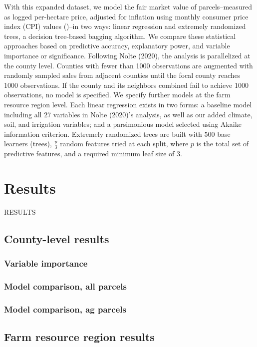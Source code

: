 \documentclass[12pt]{article}
\begin{document}
With this expanded dataset, we model the fair market value of parcels--measured as logged per-hectare price, adjusted for inflation using monthly consumer price index (CPI) values (\cite{blsConsumerPrice})--in two ways: linear regression and extremely randomized trees, a decision tree-based bagging algorithm. We compare these statistical approaches based on predictive accuracy, explanatory power, and variable importance or significance. Following Nolte (2020), the analysis is parallelized at the county level. Counties with fewer than 1000 observations are augmented with randomly sampled sales from adjacent counties until the focal county reaches 1000 observations. If the county and its neighbors combined fail to achieve 1000 observations, no model is specified. We specify further models at the farm resource region level. Each linear regression exists in two forms: a baseline model including all 27 variables in Nolte (2020)’s analysis, as well as our added climate, soil, and irrigation variables; and a parsimonious model selected using Akaike information criterion. Extremely randomized trees are built with 500 base learners (trees), $\frac{p}{3}$ random features tried at each split, where $p$ is the total set of predictive features, and a required minimum leaf size of 3.

\newpage

\section{Results}

RESULTS
\subsection{County-level results}
 \subsubsection{Variable importance}
 \subsubsection{Model comparison, all parcels}
 \subsubsection{Model comparison, ag parcels}
 
\subsection{Farm resource region results}
\end{document}
